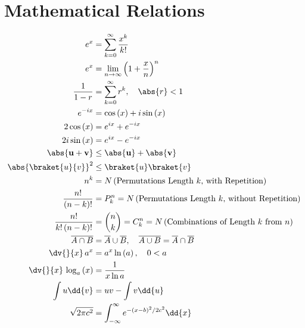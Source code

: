 \section{Mathematical Relations}
\label{misc:math}

\begin{subequations}\label{eq:misc:math}
\begin{align}
e^{x} &= \sum_{k=0}^{\infty} \frac{x^{k}}{k!} \label{eq:misc:math:ex} \\
e^{x} &= \lim_{n \to \infty} \left(1 + \frac{x}{n}\right)^{n} \label{eq:misc:math:ex_limit} \\
\frac{1}{1-r} &= \sum_{k=0}^{\infty} r^{k}, \quad \abs{r} < 1 \label{eq:misc:math:geometric} \\
e^{-i x} &= \cos\left(x\right) + i \sin\left(x\right) \label{eq:misc:math:eulers_formula} \\
2 \cos\left(x\right) &= e^{i x} + e^{-i x} \label{eq:misc:math:cos_exp} \\
2i \sin\left(x\right) &= e^{i x} - e^{-i x} \label{eq:misc:math:sin_exp} \\
\abs{\mathbf{u} + \mathbf{v}} &\leq \abs{\mathbf{u}} + \abs{\mathbf{v}} \label{eq:misc:math:triangle_inequality} \\
\abs{\braket{u}{v}}^{2} &\leq \braket{u} \braket{v} \label{eq:misc:math:cauchy_schwarz_inequality} \\
n^{k} &= N\left(\text{Permutations Length $k$, with Repetition}\right) \label{eq:misc:math:permutations_with_repetition} \\
\frac{n!}{\left(n-k\right)!} &= P_{k}^{n} = N\left(\text{Permutations Length $k$, without Repetition}\right) \label{eq:misc:math:permutations_without_repetition} \\
\frac{n!}{k!\left(n-k\right)!} &= {n \choose k} = C_{k}^{n} = N\left(\text{Combinations of Length $k$ from $n$}\right) \label{eq:misc:math:binomial_coefficient} \\
\overline{A \cap B} &= \overline{A} \cup \overline{B},\quad \overline{A \cup B} = \overline{A} \cap \overline{B} \label{eq:misc:math:de_morgan} \\
\dv{}{x}\, a^{x} &= a^{x} \ln\left(a\right), \quad 0 < a \label{eq:misc:math:diff_exp_gen} \\
\dv{}{x}\, \log_{a}\left(x\right) &= \frac{1}{x \ln a} \label{eq:misc:math:diff_log_gen} \\
\int u \dd{v} &= uv - \int v \dd{u} \label{eq:misc:math:integration_by_parts} \\
\sqrt{2 \pi c^{2}} &= \int_{-\infty}^{\infty} e^{-\left(x-b\right)^{2} / 2 c^{2}} \dd{x} \label{eq:misc:math:gaussian_integral}
\end{align}
\end{subequations}
